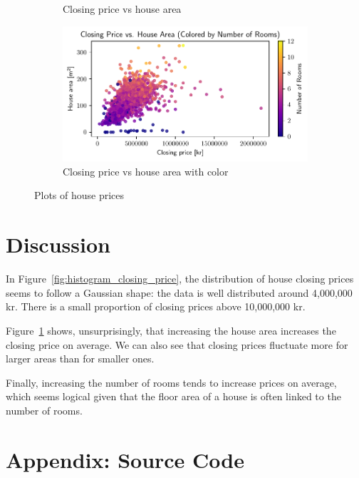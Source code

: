 \documentclass[a4paper]{article}
\begin{document}
\begin{figure}
\begin{subfigure}[b]{\textwidth}
      \caption{Closing price vs house area}
      \label{fig:closing_price_house_ares}
  \end{subfigure}
  \vfill
  \begin{subfigure}[c]{\textwidth}
      \centering
      \includegraphics[width=\textwidth]{closing_price_house_ares_color.pdf}
      \caption{Closing price vs house area with color}
      \label{fig:closing_price_house_ares_color}
  \end{subfigure}
     \caption{Plots of house prices}
     \label{fig:house_plots}
\end{figure}


\newpage

\section*{Discussion}

In Figure~\ref{fig:histogram_closing_price}, the distribution of house closing prices seems to follow a Gaussian shape: the data is well distributed around 4,000,000 kr.
There is a small proportion of closing prices above 10,000,000 kr.

Figure~\ref{fig:closing_price_house_ares} shows, unsurprisingly, that increasing the house area increases the closing price on average.
We can also see that closing prices fluctuate more for larger areas than for smaller ones.

Finally, increasing the number of rooms tends to increase prices on average, which seems logical given that the floor area of a house is often linked to the number of rooms.

\newpage


\printbibliography

\section*{Appendix: Source Code}




\end{document}
